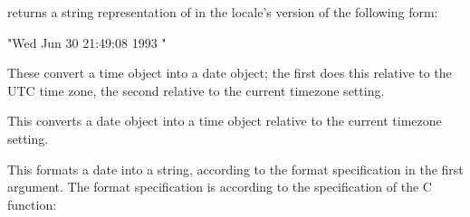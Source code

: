 \begin{protos}
\end{protos}
%
returns a string representation of  in the
locale's version of the following form:
\begin{example}
"Wed Jun 30 21:49:08 1993
"
\end{example}

\begin{protos}
\end{protos}
%
These convert a time object into a date object; the first does this
relative to the UTC time zone, the second relative to the current
timezone setting.

\begin{protos}
\end{protos}
%
This converts a date object into a time object relative to the current
timezone setting.

\begin{protos}
\end{protos}
%
This formats a date into a string, according to the format
specification in the first argument.  The format specification is
according to the specification of the C  function:

